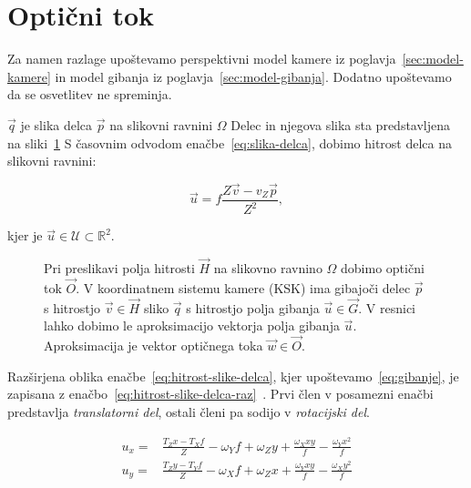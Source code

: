 \section{Optični tok} \label{sec:opticni-tok}
Za namen razlage upoštevamo perspektivni model kamere iz poglavja~\ref{sec:model-kamere} in model gibanja iz poglavja~\ref{sec:model-gibanja}. Dodatno upoštevamo da se osvetlitev ne spreminja.

$\vec{q}$ je slika delca $\vec{p}$ na slikovni ravnini $\varOmega$ Delec in njegova slika sta predstavljena na sliki~\ref{fig:optical-flow} S časovnim odvodom enačbe~\eqref{eq:slika-delca}, dobimo hitrost delca na slikovni ravnini:

\begin{equation}\label{eq:hitrost-slike-delca}
	\vec{u} = f \frac{Z\vec{v}-v_Z\vec{p}}{Z^2},
\end{equation}

kjer je $\vec{u} \in \mathcal{U} \subset \mathbb{R}^2$.




\begin{figure}[htb]
\centering

\caption[Preslikava hitrosti delca na slikovno ravnino $\varOmega$]{Pri preslikavi polja hitrosti $\vec{H}$ na slikovno ravnino $\varOmega$ dobimo optični tok $\vec{O}$. V koordinatnem sistemu kamere (KSK) ima gibajoči delec $\vec{p}$ s hitrostjo $\vec{v} \in \vec{H}$ sliko $\vec{q}$ s hitrostjo polja gibanja $\vec{u} \in \vec{G}$. V resnici lahko dobimo le aproksimacijo vektorja polja gibanja $\vec{u}$. Aproksimacija je vektor optičnega toka $\vec{w} \in \vec{O}$.}
\label{fig:optical-flow}
\end{figure}




Razširjena oblika enačbe~\eqref{eq:hitrost-slike-delca}, kjer upoštevamo~\eqref{eq:gibanje}, je zapisana z enačbo~\eqref{eq:hitrost-slike-delca-raz}~\cite{trucco1998introductory}. Prvi člen v posamezni enačbi predstavlja \emph{translatorni del}, ostali členi pa sodijo v \emph{rotacijski del}.

\begin{equation}\label{eq:hitrost-slike-delca-raz}
\begin{aligned}
	u_x = & \frac{T_Z x - T_X f}{Z} - \omega_Y f + \omega_Z y + \frac{\omega_X x y}{f} - \frac{\omega_Y x^2}{f} \\
    u_y = & \frac{T_Z y - T_Y f}{Z} - \omega_X f + \omega_Z x + \frac{\omega_Y x y}{f} - \frac{\omega_X y^2}{f}
\end{aligned}
\end{equation}

